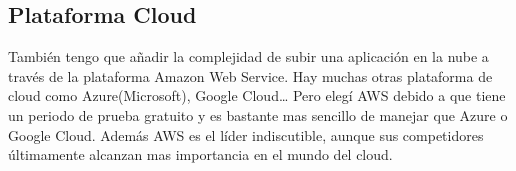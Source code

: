 \subsection{Plataforma Cloud}

También tengo que añadir la complejidad de subir una aplicación en la nube a través de la plataforma Amazon Web Service. Hay muchas otras plataforma de cloud como Azure(Microsoft), Google Cloud… Pero elegí AWS debido a que tiene un periodo de prueba gratuito y es bastante mas sencillo de manejar que Azure o Google Cloud. Además AWS es el líder indiscutible, aunque sus competidores últimamente alcanzan mas importancia en el mundo del cloud.

